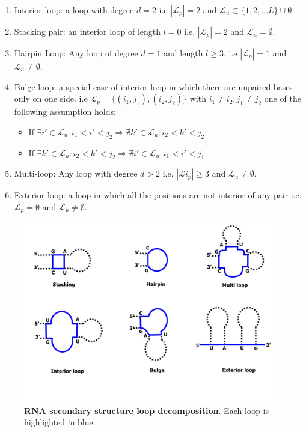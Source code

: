 \begin{mydef}
	\begin{enumerate}
		\item Interior loop: a loop with degree $d=2$ i.e $|\mathcal{L}_p|=2$ and $\mathcal{L}_u \subset \{1,2,\dots L\}\cup \emptyset$.
		\item Stacking pair: an interior loop of length $l=0$ i.e. $|\mathcal{L}_p|=2$ and $\mathcal{L}_u = \emptyset$.
		\item Hairpin Loop: Any loop of degree $d=1$ and length $l \geq 3$.  i.e $|\mathcal{L}_p|=1$ and  $\mathcal{L}_u \neq \emptyset$.
		\item Bulge loop: a special case of interior loop in which there are unpaired bases only on one side. i.e  $\mathcal{L}_p=\{(i_1,j_1), (i_2, j_2)\}$ with $i_1 \neq i_2, j_1\neq j_2$ one of the following assumption holds: 
		\begin{itemize}
			\item If $\exists i'\in \mathcal{L}_u \colon i_1<i'<j_2 \Rightarrow \nexists k'\in \mathcal{L}_u \colon i_2<k'<j_2$ 
			\item If $\exists k'\in \mathcal{L}_u \colon i_2<k'<j_2 \Rightarrow \nexists i'\in \mathcal{L}_u \colon i_1<i'<j_1$ 
		\end{itemize}
		\item Multi-loop: Any loop with degree $d>2$ i.e.  $|\mathcal{L}i_p| \geq 3$  and $\mathcal{L}_u \neq \emptyset$.
		\item Exterior loop: a loop in which all the positions are not interior of any pair i.e. $\mathcal{L}_p=\emptyset$ and $\mathcal{L}_u \neq \emptyset$.
	\end{enumerate}
\end{mydef}

\begin{figure}[H]
	\includegraphics[width=1.0 \linewidth]{../res/images/loops.pdf}
	\caption{\textbf{\ac{RNA} secondary structure loop decomposition}. Each loop is highlighted in blue.}\label{fig:loops}
\end{figure}

